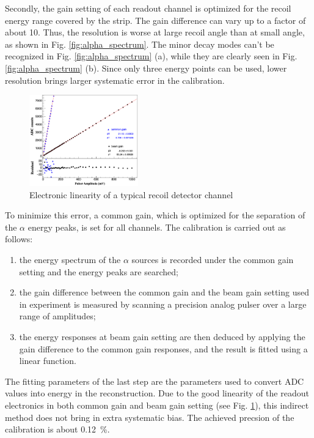 \documentclass[number,5p]{elsarticle}
\begin{document}
Secondly, the gain setting of each readout channel is optimized for the recoil
energy range covered by the strip.
The gain difference can vary up to a factor of about 10.
Thus, the resolution is worse at large recoil angle than at small angle, as shown in Fig. \ref{fig:alpha_spectrum}.
The minor decay modes can't be recognized in Fig. \ref{fig:alpha_spectrum} (a), while they are clearly seen in Fig. \ref{fig:alpha_spectrum} (b).
Since only three energy points can be used, lower resolution brings larger systematic error in the calibration.

\begin{figure}[htbp]
\centering
\includegraphics[width=0.42\textwidth]{./linearity.png}
\caption{Electronic linearity of a typical recoil detector channel}
\label{fig:electronic_linearity}
\end{figure}

To minimize this error, a common gain, which is optimized for the separation of the \(\alpha\) energy peaks, is set for all channels.
The calibration is carried out as follows:
\begin{enumerate}
\item the energy spectrum of the \(\alpha\) sources is recorded under the common gain setting and the energy peaks are searched;
\item the gain difference between the common gain and the beam gain setting used
  in experiment is measured by scanning a precision analog pulser over a large range of amplitudes;
\item the energy responses at beam gain setting are then deduced by applying the gain
  difference to the common gain responses, and the result is fitted using a linear function.
\end{enumerate}
The fitting parameters of the last step are the parameters used to convert ADC
values into energy in the reconstruction.
Due to the good linearity of the readout electronics in both common gain
and beam gain setting (see Fig. \ref{fig:electronic_linearity}), this indirect
method does not bring in extra systematic bias.
The achieved precsion of the calibration is about \SI{0.12}{\percent}.
\end{document}

